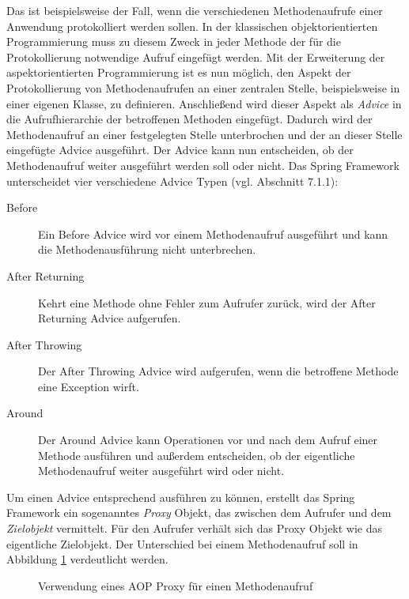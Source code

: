 Das ist beispielsweise der Fall, wenn die verschiedenen Methodenaufrufe einer
Anwendung protokolliert werden sollen. In der klassischen objektorientierten
Programmierung muss zu diesem Zweck in jeder Methode der für die Protokollierung
notwendige Aufruf eingefügt werden. Mit der Erweiterung der aspektorientierten
Programmierung ist es nun möglich, den Aspekt der Protokollierung von
Methodenaufrufen an einer zentralen Stelle, beispielsweise in einer eigenen
Klasse, zu definieren. Anschließend wird dieser Aspekt als \emph{Advice} in die
Aufrufhierarchie der betroffenen Methoden eingefügt. Dadurch wird der
Methodenaufruf an einer festgelegten Stelle unterbrochen und der an dieser
Stelle eingefügte Advice ausgeführt. Der Advice kann nun entscheiden, ob der
Methodenaufruf weiter ausgeführt werden soll oder nicht. Das Spring Framework
unterscheidet vier verschiedene Advice Typen (vgl. \cite{spring:reference}
Abschnitt 7.1.1):

\begin{description}
  \item[Before] Ein Before Advice wird vor einem Methodenaufruf ausgeführt und
  kann die Methodenausführung nicht unterbrechen.
  \item[After Returning] Kehrt eine Methode ohne Fehler zum Aufrufer zurück,
  wird der After Returning Advice aufgerufen.
  \item[After Throwing] Der After Throwing Advice wird aufgerufen, wenn die
  betroffene Methode eine Exception wirft.
  \item[Around] Der Around Advice kann Operationen vor und nach dem Aufruf
  einer Methode ausführen und außerdem entscheiden, ob der eigentliche
  Methodenaufruf weiter ausgeführt wird oder nicht.
\end{description}

Um einen Advice entsprechend ausführen zu können, erstellt das Spring Framework
ein sogenanntes \emph{Proxy} Objekt, das zwischen dem Aufrufer und dem
\emph{Zielobjekt} vermittelt. Für den Aufrufer verhält sich das Proxy Objekt wie
das eigentliche Zielobjekt. Der Unterschied bei einem Methodenaufruf soll in
Abbildung \ref{ill:aopproxy} verdeutlicht werden.

\begin{figure}[bth]
	\caption{Verwendung eines AOP Proxy für einen Methodenaufruf}
	\label{ill:aopproxy}
\end{figure}
 

